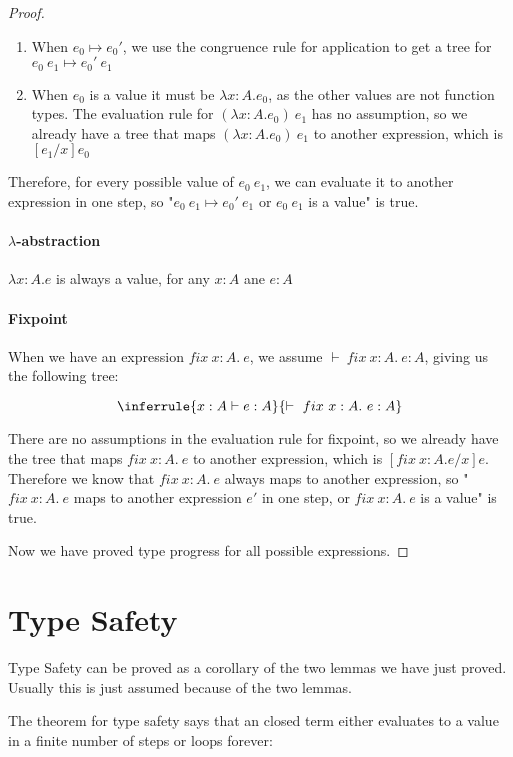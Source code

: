 \begin{proof}
\begin{enumerate}
\item{When $e_0 \mapsto e_0'$, we use the congruence rule for application to get a tree for $e_0 \ e_1 \mapsto e_0' \ e_1$}
\item{When $e_0$ is a value it must be $\lambda x:A. e_0$, as the other values are not function types. The evaluation rule for $(\lambda x:A. e_0 ) \ e_1$ has no assumption, so we already have a tree that maps $(\lambda x:A. e_0 ) \ e_1$ to another expression, which is $[e_1/x]e_0$}
\end{enumerate}

Therefore, for every possible value of $e_0 \ e_1$, we can evaluate it to another expression in one step, so "$e_0 \ e_1 \mapsto e_0' \  e_1$ or $e_0 \ e_1$ is a value" is true. 

\paragraph{$\lambda$-abstraction} $\lambda x:A.e$ is always a value, for any $x:A$ ane $e : A$

\paragraph{Fixpoint} When we have an expression $fix \ x:A. \ e$, we assume $\vdash \ fix \ x:A. \ e : A$, giving us the following tree:

$$
\inferrule {x : A \vdash e : A }
  { \vdash \  fix \ x:A . \ e : A}
$$

There are no assumptions in the evaluation rule for fixpoint, so we already have the tree that maps $fix \ x:A. \ e$ to another expression, which is  $[fix \ x:A. e/x]e$. Therefore we know that $fix \ x:A. \ e$ always maps to another expression, so "$fix \ x:A. \ e$ maps to another expression $e'$ in one step, or $fix \ x:A. \ e$ is a value" is true.

Now we have proved type progress for all possible expressions.
\end{proof}


\section{Type Safety}

Type Safety can be proved as a corollary of the two lemmas we have just proved. Usually this is just assumed because of the two lemmas. 

The theorem for type safety says that an closed term either evaluates to a value in a finite number of steps or loops forever:

